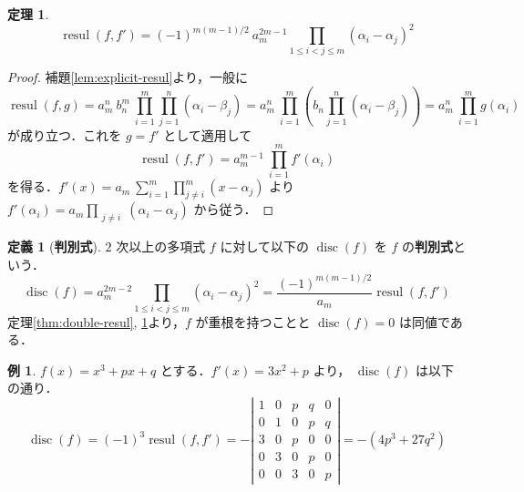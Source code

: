\documentclass[12pt, uplatex, dvipdfmx]{jsarticle}
\newcommand{\ds}{\displaystyle}
\theoremstyle{definition}
\newtheorem{theorem}{定理}
\newtheorem*{definition}{定義}
\newtheorem{example}{例}
\DeclareMathOperator{\resul}{resul}
\DeclareMathOperator{\disc}{disc}
\begin{document}



\begin{theorem}\label{thm:resul-disc}
  \[
    \resul(f,f') = (-1)^{m(m-1)/2}\ a_m^{2m-1} \prod_{1 \leq i < j \leq m} (\alpha_i - \alpha_j)^2
  \]
\end{theorem}

\begin{proof}
  補題\ref{lem:explicit-resul}より，一般に
  \[
    \resul(f,g) = a_m^n \ b_n^m\ \prod_{i=1}^{m} \prod_{j=1}^{n} (\alpha_i-\beta_j)
    =a_m^n \ \prod_{i=1}^{m} \left( b_n \prod_{j=1}^{n}(\alpha_i-\beta_j)\right) = a_m^n\ \prod_{i=1}^{m} g(\alpha_i)
  \]
  が成り立つ．これを $g=f'$ として適用して
  \[
    \resul(f, f') = a_m^{m-1} \ \prod_{i=1}^{m} f'(\alpha_i)
  \]
  を得る．$\ds f'(x) = a_m\ \sum_{i=1}^{m} \prod_{j \neq
      i}^{m} (x-\alpha_j)$ より
  $\ds f'(\alpha_i) = a_m \prod_{\substack{j \neq i}}
  (\alpha_i-\alpha_j)$ から従う．
\end{proof}

\begin{definition}[\textbf{判別式}] $2$ 次以上の多項式 $f$ に対して以下の $\disc(f)$ を $f$ の\textbf{判別式}という．
  \[
    \disc(f) = a_m^{2m-2} \prod_{1 \leq i < j \leq m} (\alpha_i-\alpha_j)^2 = \frac{(-1)^{m(m-1)/2}}{a_m} \resul(f,f')
  \]
  定理\ref{thm:double-resul}, \ref{thm:resul-disc}より，$f$ が重根を持つことと $\disc(f)=0$ は同値である．
\end{definition}

\begin{example}
  $f(x) = x^3+px+q$ とする．$f'(x) = 3x^2+p$ より， $\disc(f)$ は以下の通り．
  \[
    \disc(f) = (-1)^3 \resul(f,f') = -\left|
      \begin{array}{ccccc}
        1 & 0 & p & q & 0\\
        0 & 1 & 0 & p & q\\
        3 & 0 & p & 0 & 0\\
        0 & 3 & 0 & p & 0\\
        0 & 0 & 3 & 0 & p
      \end{array}
    \right| = -(4p^3+27q^2)
  \]
\end{example}
\end{document}
